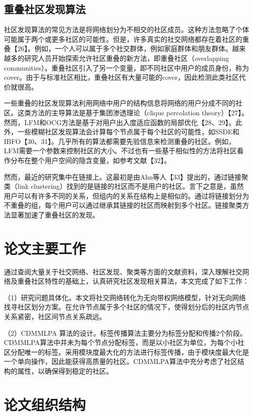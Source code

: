 \subsection{重叠社区发现算法}

社区发现算法的常见方法是将网络划分为不相交的社区成员。这种方法忽略了个体可能属于两个或更多社区的可能性。但是，许多真实的社交网络都存在着社区的重叠【26】。例如，一个人可以属于多个社交群体，例如家庭群体和朋友群体。越来越多的研究人员开始探索允许社区重叠的新方法，即重叠社区（overlapping communities）。重叠社区引入了另一个变量，即不同社区中用户的成员身份，称为cover。由于与标准社区相比，重叠社区有大量可能的cover，因此检测此类社区代价就很高。

一些重叠的社区发现算法利用网络中用户的结构信息将网络的用户分成不同的社区。这类方法的主导算法是基于集团渗透理论（clique percolation theory）【27】。然而，LFM和OCG方法是基于对用户出入度适应函数的局部优化【28、29】。此外，一些模糊社区发现算法会计算每个节点属于每个社区的可能性，如SSDE和IBFO【30、31】。几乎所有的算法都需要先验信息来检测重叠的社区。例如，LFM需要一个参数来控制社区的大小。不过也有一些基于相似性的方法将社区看作分布在整个用户空间的隐含变量，如参考文献【32】。

然而，最近的研究集中在链接上。这最初是由Ahn等人【33】提出的，通过链接聚类（link clustering）找到的是链接的社区而不是用户的社区。言下之意是，虽然用户可以有许多不同的关系，但组内的关系在结构上是相似的。通过将链接划分为不重叠的组，每个用户可以通过继承其链接的社区而映射到多个社区。链接聚类方法显著加速了重叠社区的发现。

\section{论文主要工作}

通过查阅大量关于社交网络、社区发现、聚类等方面的文献资料，深入理解社交网络及重叠社区特性的基础上，认真研究社区发现相关算法，本文完成了如下工作：

（1）研究问题具体化。本文将社交网络转化为无向带权网络模型，针对无向网络找寻社区划分方案。在允许节点属于多个社区的情况下，使得划分后的社区内节点关系紧密，社区间节点关系疏远。

（2）CDMMLPA 算法的设计。标签传播算法主要分为标签分配和传播2个阶段。CDMMLPA算法中并未为每个节点分配标签，而是以小社区为单位，为每个小社区分配唯一的标签。采用模块度最大化的方法进行标签传播，由于模块度最大化是一个单向操作，因此能获得高质量的社区。CDMMLPA算法中充分考虑了社区结构的属性，以确保得到稳定的社区。

\section{论文组织结构}

